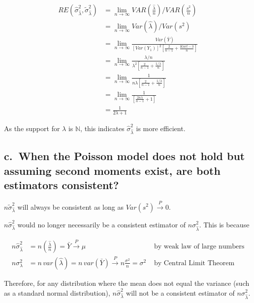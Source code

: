 \documentclass[
  letterpaper,
  DIV=11,
  numbers=noendperiod]{scrreprt}
\begin{document}
\[
\begin{aligned}
RE(\hat{\sigma}^2_{\hat{\lambda}},\tilde{\sigma}^2_{\hat{\lambda}}) &= \lim_{n \to \infty} VAR(\frac{\hat{\lambda}}{n})/VAR(\frac{s^2}{n}) \\
&= \lim_{n \to \infty} Var(\hat{\lambda})/Var({s^2}) \\
&= \lim_{n \to \infty}\frac{Var(\bar{Y})}{[Var(Y_1)]^2[\frac{2}{n-1}+\frac{Kurt -3}{n}]} \\
&= \lim_{n \to \infty}\frac{\lambda/n}{\lambda^2\left[\frac{2}{n-1}+\frac{1/\lambda}{n}\right]} \\
&= \lim_{n \to \infty}\frac{1}{n\lambda\left[\frac{2}{n-1}+\frac{1/\lambda}{n}\right]} \\
&= \lim_{n \to \infty}\frac{1}{\left[\frac{2n\lambda}{n-1}+1\right]} \\
&= \frac{1}{2\lambda + 1}
\end{aligned}
\]

As the support for \(\lambda\) is \(\mathbb N\), this indicates
\(\hat{\sigma}^2_{\hat{\lambda}}\) is more efficient.

\hypertarget{c.-when-the-poisson-model-does-not-hold-but-assuming-second-moments-exist-are-both-estimators-consistent}{%
\subsection{c.~When the Poisson model does not hold but assuming second
moments exist, are both estimators
consistent?}\label{c.-when-the-poisson-model-does-not-hold-but-assuming-second-moments-exist-are-both-estimators-consistent}}

\(n\tilde{\sigma}^2_{\hat{\lambda}}\) will always be consistent as long
as \(Var(s^2) \overset{P}{\to} 0\).

\(n\hat{\sigma}^2_{\hat{\lambda}}\) would no longer necessarily be a
consistent estimator of \(n{\sigma}^2_{\hat{\lambda}}\). This is because

\[\begin{aligned}
n\hat{\sigma}^2_{\hat{\lambda}} &= n\left(\frac{\hat{\lambda}}{n} \right) = \bar{Y} \overset{P}{\to} \mu &\text{ by weak law of large numbers} \\
n{\sigma}^2_{{\lambda}} &= n \, var(\hat{\lambda}) =n\,var(\bar{Y}) \overset{P}{\to} n\frac{\sigma^2}{n} = \sigma^2 & \text{ by Central Limit Theorem}
\end{aligned}\]

Therefore, for any distribution where the mean does not equal the
variance (such as a standard normal distribution),
\(n{\hat{\sigma}}^2_{\hat{\lambda}}\) will not be a consistent estimator
of \(n{\sigma}^2_{\hat{\lambda}}\).
\end{document}

